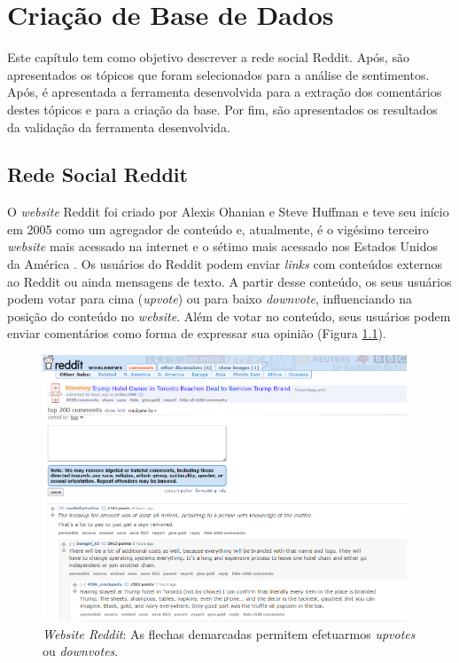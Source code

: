 \chapter{Criação de Base de Dados}
\label{cap:banco}
Este capítulo tem como objetivo descrever a rede social Reddit.
Após, são apresentados os tópicos que foram selecionados para a análise de
sentimentos. Após, é apresentada a ferramenta desenvolvida para a extração
dos comentários destes tópicos e para a criação da base. Por fim, são
apresentados os resultados da validação da ferramenta desenvolvida.
\section{Rede Social Reddit}
\label{cap:Reddit}

O \textit{website} Reddit foi criado por Alexis Ohanian e Steve Huffman e teve
seu início em 2005 como um agregador de conteúdo e, atualmente, é o vigésimo terceiro \textit{website} mais acessado na
internet e o sétimo mais acessado nos Estados Unidos da América \cite{alexa}.
Os usuários do Reddit podem enviar \textit{links} com conteúdos externos
ao Reddit ou ainda mensagens de texto. A partir desse conteúdo, os seus
usuários podem votar para cima (\textit{upvote}) ou para baixo \textit{downvote},
influenciando na posição do conteúdo no \textit{website}. Além de votar no conteúdo, seus usuários podem enviar comentários como
forma de expressar sua opinião (Figura \ref{fig:reddit}).


\begin{figure}[!htbp]
\centering
\includegraphics[height=300px]{imagens/reddit.png}
\caption{\textit{Website Reddit}:  As flechas demarcadas permitem efetuarmos
\textit{upvotes} ou \textit{downvotes}.}
\label{fig:reddit}
\end{figure}

